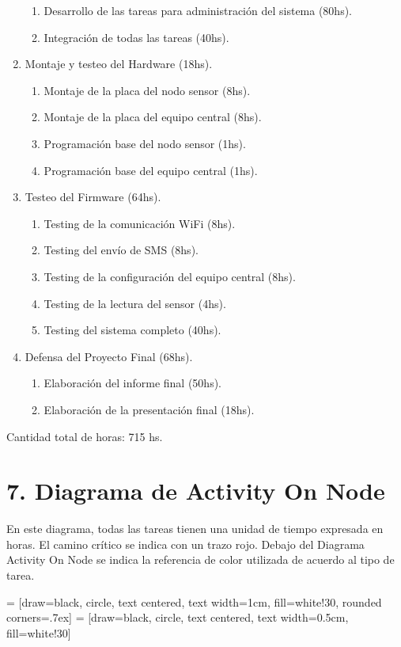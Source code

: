 \documentclass[11pt]{charter}
\begin{document}
\begin{enumerate}
\begin{enumerate}
	\item Desarrollo de las tareas para administración del sistema (80hs).
	\item Integración de todas las tareas (40hs).
	\end{enumerate}
\item Montaje y testeo del Hardware (18hs).
	\begin{enumerate}
	\item Montaje de la placa del nodo sensor (8hs).
	\item Montaje de la placa del equipo central (8hs).
	\item Programación base del nodo sensor (1hs).
	\item Programación base del equipo central (1hs).
	\end{enumerate}
\item Testeo del Firmware (64hs).
	\begin{enumerate}
	\item Testing de la comunicación WiFi (8hs).
	\item Testing del envío de SMS (8hs).
	\item Testing de la configuración del equipo central (8hs).
	\item Testing de la lectura del sensor (4hs).
	\item Testing del sistema completo (40hs).
	\end{enumerate}
\item Defensa del Proyecto Final (68hs).
	\begin{enumerate}
	\item Elaboración del informe final (50hs).
	\item Elaboración de la presentación final (18hs).
	\end{enumerate}
\end{enumerate}

Cantidad total de horas: 715 hs.

\section{7. Diagrama de Activity On Node}
\label{sec:AoN}

En este diagrama, todas las tareas tienen una unidad de tiempo expresada en horas. El camino crítico se indica con un trazo rojo. Debajo del Diagrama Activity On Node se indica la referencia de color utilizada de acuerdo al tipo de tarea.

\usetikzlibrary{positioning}

 = [draw=black, circle, text centered, text width=1cm, fill=white!30, rounded corners=.7ex]
     = [draw=black, circle, text centered, text width=0.5cm, fill=white!30]
\end{document}
